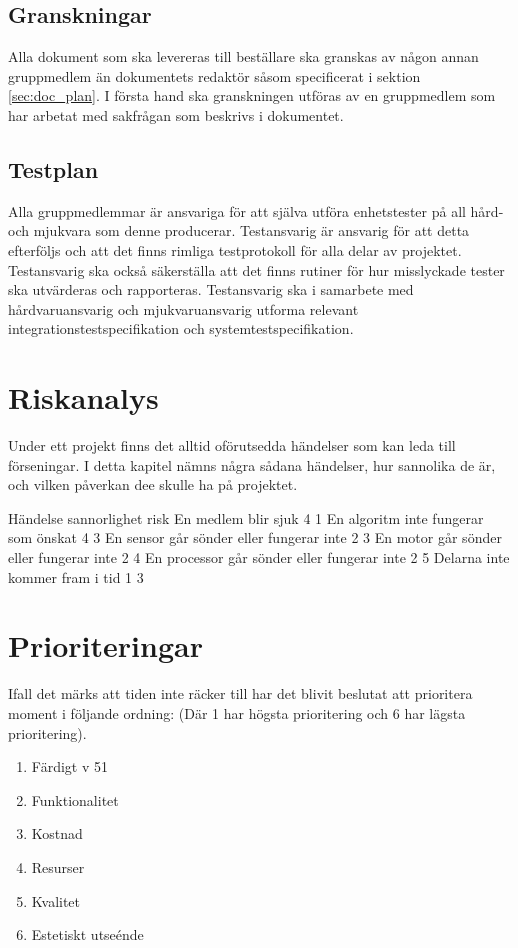\documentclass[a4paper,11pt]{article}
\begin{document}
    \subsection{Granskningar}
    Alla dokument som ska levereras till beställare ska granskas av någon annan gruppmedlem än dokumentets redaktör såsom specificerat i sektion \ref{sec:doc_plan}. I första hand ska granskningen utföras av en gruppmedlem som har arbetat med sakfrågan som beskrivs i dokumentet.
    
    \subsection{Testplan}
    Alla gruppmedlemmar är ansvariga för att själva utföra enhetstester på all hård- och mjukvara som denne producerar. Testansvarig är ansvarig för att detta efterföljs och att det finns rimliga testprotokoll för alla delar av projektet. Testansvarig ska också säkerställa att det finns rutiner för hur misslyckade tester ska utvärderas och rapporteras. Testansvarig ska i samarbete med hårdvaruansvarig och mjukvaruansvarig utforma relevant integrationstestspecifikation och systemtestspecifikation.
    
    \section{Riskanalys}
    Under ett projekt finns det alltid oförutsedda händelser som kan leda till förseningar. I detta kapitel nämns några sådana händelser, hur sannolika de är, och vilken påverkan dee skulle ha på projektet.

    Händelse sannorlighet risk
    En medlem blir sjuk 4 1
    En algoritm inte fungerar som önskat 4 3
    En sensor går sönder eller fungerar inte 2 3
    En motor går sönder eller fungerar inte 2 4
    En processor går sönder eller fungerar inte 2 5
    Delarna inte kommer fram i tid 1 3
    
    
    \section{Prioriteringar}
    Ifall det märks att tiden inte räcker till har det blivit beslutat att prioritera moment i följande ordning: (Där 1 har högsta prioritering och 6 har lägsta prioritering).
    
    \begin{enumerate}
        \item Färdigt v 51
        \item Funktionalitet
        \item Kostnad
        \item Resurser
        \item Kvalitet
        \item Estetiskt utseénde
    \end{enumerate}
    
\end{document}
